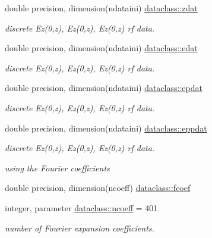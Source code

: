 \textbf{ }\par
\begin{DoxyCompactItemize}
\item 
double precision, dimension(ndataini) \mbox{\hyperlink{namespacedataclass_aeed47a37719b1f84d885a1cb8a962081}{dataclass\+::zdat}}
\begin{DoxyCompactList}\small\item\em discrete Ez(0,z), Ez\textquotesingle{}(0,z), Ez\textquotesingle{}\textquotesingle{}(0,z) rf data. \end{DoxyCompactList}\item 
double precision, dimension(ndataini) \mbox{\hyperlink{namespacedataclass_a67357b933079ed021a94705c576fead0}{dataclass\+::edat}}
\begin{DoxyCompactList}\small\item\em discrete Ez(0,z), Ez\textquotesingle{}(0,z), Ez\textquotesingle{}\textquotesingle{}(0,z) rf data. \end{DoxyCompactList}\item 
double precision, dimension(ndataini) \mbox{\hyperlink{namespacedataclass_a2f77b697b14f3e0d557f044ea69402d8}{dataclass\+::epdat}}
\begin{DoxyCompactList}\small\item\em discrete Ez(0,z), Ez\textquotesingle{}(0,z), Ez\textquotesingle{}\textquotesingle{}(0,z) rf data. \end{DoxyCompactList}\item 
double precision, dimension(ndataini) \mbox{\hyperlink{namespacedataclass_a1c9d30100962693c922470368987ec8a}{dataclass\+::eppdat}}
\begin{DoxyCompactList}\small\item\em discrete Ez(0,z), Ez\textquotesingle{}(0,z), Ez\textquotesingle{}\textquotesingle{}(0,z) rf data. \end{DoxyCompactList}\end{DoxyCompactItemize}

\textbf{ }\par
{\em using the Fourier coefficients }\begin{DoxyCompactItemize}
\item 
double precision, dimension(ncoeff) \mbox{\hyperlink{namespacedataclass_ac8605e11e3fc14fbebbc843cc36c2836}{dataclass\+::fcoef}}
\end{DoxyCompactItemize}

\textbf{ }\par
\begin{DoxyCompactItemize}
\item 
integer, parameter \mbox{\hyperlink{namespacedataclass_aea44837b0eb59e9b5a864f3a59c7facc}{dataclass\+::ncoeff}} = 401
\begin{DoxyCompactList}\small\item\em number of Fourier expansion coefficients. \end{DoxyCompactList}\end{DoxyCompactItemize}



